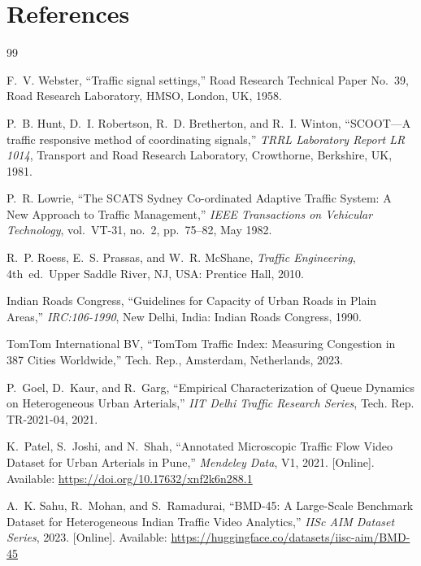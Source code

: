 \chapter*{References}
\label{ch:references}

\begin{small}
\begin{thebibliography}{99}
\setlength{\itemsep}{0.25em}
\setlength{\parskip}{0pt}

F.~V. Webster, ``Traffic signal settings,'' Road Research Technical Paper No.~39, Road Research Laboratory, HMSO, London, UK, 1958.

P.~B. Hunt, D.~I. Robertson, R.~D. Bretherton, and R.~I. Winton, ``SCOOT---A traffic responsive method of coordinating signals,'' \emph{TRRL Laboratory Report LR 1014}, Transport and Road Research Laboratory, Crowthorne, Berkshire, UK, 1981.

P.~R. Lowrie, ``The SCATS Sydney Co-ordinated Adaptive Traffic System: A New Approach to Traffic Management,'' \emph{IEEE Transactions on Vehicular Technology}, vol.~VT-31, no.~2, pp.~75--82, May 1982.

R.~P. Roess, E.~S. Prassas, and W.~R. McShane, \emph{Traffic Engineering}, 4th~ed.\ Upper Saddle River, NJ, USA: Prentice Hall, 2010.

Indian Roads Congress, ``Guidelines for Capacity of Urban Roads in Plain Areas,'' \emph{IRC:106-1990}, New Delhi, India: Indian Roads Congress, 1990.

TomTom International BV, ``TomTom Traffic Index: Measuring Congestion in 387 Cities Worldwide,'' Tech. Rep., Amsterdam, Netherlands, 2023.

P.~Goel, D.~Kaur, and R.~Garg, ``Empirical Characterization of Queue Dynamics on Heterogeneous Urban Arterials,'' \emph{IIT Delhi Traffic Research Series}, Tech. Rep. TR-2021-04, 2021.

K.~Patel, S.~Joshi, and N.~Shah, ``Annotated Microscopic Traffic Flow Video Dataset for Urban Arterials in Pune,'' \emph{Mendeley Data}, V1, 2021. [Online]. Available: \url{https://doi.org/10.17632/xnf2k6n288.1}

A.~K. Sahu, R.~Mohan, and S.~Ramadurai, ``BMD-45: A Large-Scale Benchmark Dataset for Heterogeneous Indian Traffic Video Analytics,'' \emph{IISc AIM Dataset Series}, 2023. [Online]. Available: \url{https://huggingface.co/datasets/iisc-aim/BMD-45}


\end{thebibliography}
\end{small}
